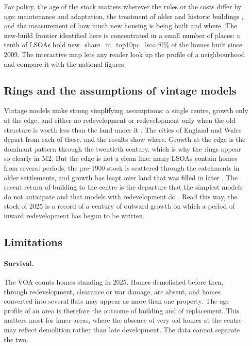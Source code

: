 For policy, the age of the stock matters wherever the rules or the costs differ by age: maintenance and adaptation, the treatment of older and historic buildings \citep{waights2019}, and the measurement of how much new housing is being built and where. The new-build frontier identified here is concentrated in a small number of places: a tenth of LSOAs hold {{new_share_in_top10pc_lsoa|f0}}\% of the homes built since 2009. The interactive map lets any reader look up the profile of a neighbourhood and compare it with the national figures.

\subsection{Rings and the assumptions of vintage models}
Vintage models make strong simplifying assumptions: a single centre, growth only at the edge, and either no redevelopment or redevelopment only when the old structure is worth less than the land under it \citep{brueckner1980,wheaton1982}. The cities of England and Wales depart from each of these, and the results show where. Growth at the edge is the dominant pattern through the twentieth century, which is why the rings appear so clearly in M2. But the edge is not a clean line: many LSOAs contain homes from several periods, the pre-1900 stock is scattered through the catchments in older settlements, and growth has leapt over land that was filled in later \citep{rodriguez1986}. The recent return of building to the centre is the departure that the simplest models do not anticipate and that models with redevelopment do \citep{braid2001}. Read this way, the stock of 2025 is a record of a century of outward growth on which a period of inward redevelopment has begun to be written.

\subsection{Limitations}
\paragraph{Survival.} The VOA counts homes standing in 2025. Homes demolished before then, through redevelopment, clearance \citep{yelling2000} or war damage, are absent, and homes converted into several flats may appear as more than one property. The age profile of an area is therefore the outcome of building and of replacement. This matters most for inner areas, where the absence of very old homes at the centre may reflect demolition rather than late development. The data cannot separate the two.

